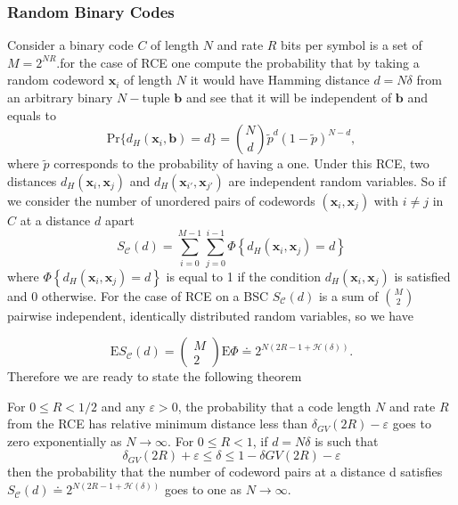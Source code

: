 \subsubsection{Random Binary Codes}
Consider a binary code $C$ of length $N$ and rate $R$ bits per symbol is a set of $M=2^{NR}$.for the case of RCE one compute the probability that by taking a random codeword $\mathbf{x}_i$ of length $N$ it would have Hamming distance $d=N\delta$ from an arbitrary binary $N-$tuple $\mathbf{b}$ and see that it will be independent of $\mathbf{b}$ and equals to
\begin{equation}
\text{Pr}\{d_H(\mathbf{x}_i,\mathbf{b})=d\}={N\choose d} \tilde{p}^d (1-\tilde{p})^{N-d},
\end{equation}
where $\tilde{p}$ corresponds to the probability of having a one. Under this RCE, two distances $d_H(\mathbf{x}_i,\mathbf{x}_j)$ and $d_H(\mathbf{x}_{i'},\mathbf{x}_{j'})$ are independent random variables. So if we consider the number of unordered pairs of codewords $(\mathbf{x}_i,\mathbf{x}_j)$ with $i\neq j$ in $C$ at a distance $d$ apart
\begin{equation}
S_{\mathcal{C}}(d)=\sum_{i=0}^{M-1} \sum_{j=0}^{i-1} \Phi\left\{d_{H}\left(\boldsymbol{x}_{i}, \boldsymbol{x}_{j}\right)=d\right\}
\end{equation}
where $\Phi\left\{d_{H}\left(\boldsymbol{x}_{i}, \boldsymbol{x}_{j}\right)=d\right\}$ is equal to 1 if the condition $d_H(\mathbf{x}_i,\mathbf{x}_j)$ is satisfied and $0$ otherwise. For the case of RCE on a BSC $S_{\mathcal{C}}(d)$ is a sum of ${M\choose 2}$ pairwise independent, identically distributed random variables, so we have

\begin{equation}
\mathrm{E} S_{\mathcal{C}}(d)=\left(\begin{array}{c}
M \\
2
\end{array}\right) \mathrm{E} \Phi \doteq 2^{N(2 R-1+\mathcal{H}(\delta))}.
\end{equation}
Therefore we are ready to state the following theorem
\begin{theorem}
For $0\leq R< 1/2$ and any $\varepsilon>0$, the probability that a code length $N$ and rate $R$ from the RCE has relative minimum distance less than $\delta_{GV}(2R)-\varepsilon$ goes to zero exponentially as $N\to \infty$. For $0\leq R < 1$, if $d=N\delta$ is such that
\begin{equation}
\delta_{GV}(2R)+\varepsilon \leq \delta \leq 1- \delta{GV}(2R) - \varepsilon
\end{equation}
then the probability that the number of codeword pairs at a distance d satisfies $S_{\mathcal{C}}(d) \doteq 2^{N(2 R-1+\mathcal{H}(\delta))}$ goes to one as $N\to \infty$.
\end{theorem}

